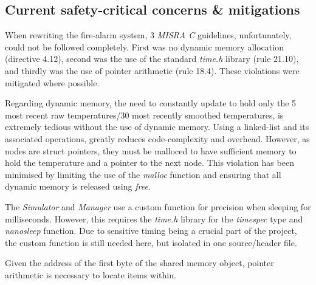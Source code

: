 \documentclass[a4paper]{article}
\begin{document}
\subsection{Current safety-critical concerns \& mitigations}

\par When rewriting the fire-alarm system, 3 \emph{MISRA C} guidelines, unfortunately, could not be followed completely. First was no dynamic memory allocation (directive 4.12), second was the use of the standard \emph{time.h} library (rule 21.10), and thirdly was the use of pointer arithmetic (rule 18.4). These violations were mitigated where possible.

\par Regarding dynamic memory, the need to constantly update to hold only the 5 most recent raw temperatures/30 most recently smoothed temperatures, is extremely tedious without the use of dynamic memory. Using a linked-list and its associated operations, greatly reduces code-complexity and overhead. However, as nodes are struct pointers, they must be malloced to have sufficient memory to hold the temperature and a pointer to the next node. This violation has been minimised by limiting the use of the \emph{malloc} function and ensuring that all dynamic memory is released using \emph{free}.

\par The \emph{Simulator} and \emph{Manager} use a custom function for precision when sleeping for milliseconds. However, this requires the \emph{time.h} library for the \emph{timespec} type and \emph{nanosleep} function. Due to sensitive timing being a crucial part of the project, the custom function is still needed here, but isolated in one source/header file.

\par Given the address of the first byte of the shared memory object, pointer arithmetic is necessary to locate items within.




\end{document}
